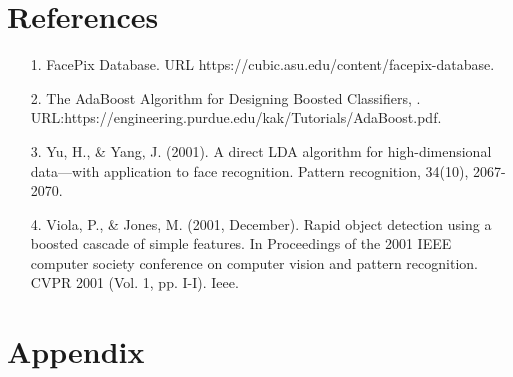 \documentclass{article}
\begin{document}
\newpage
\section{References}
\begin{itemize}
\item[1.] FacePix Database. URL https://cubic.asu.edu/content/facepix-database.
\item[2.] The AdaBoost Algorithm for Designing Boosted Classifiers, . URL:https://engineering.purdue.edu/kak/Tutorials/AdaBoost.pdf.
\item[3.] Yu, H., \& Yang, J. (2001). A direct LDA algorithm for high-dimensional data—with application to face recognition. Pattern recognition, 34(10), 2067-2070.
\item[4.] Viola, P., \& Jones, M. (2001, December). Rapid object detection using a boosted cascade of simple features. In Proceedings of the 2001 IEEE computer society conference on computer vision and pattern recognition. CVPR 2001 (Vol. 1, pp. I-I). Ieee.
\end{itemize}

\section{Appendix}
\end{document}

